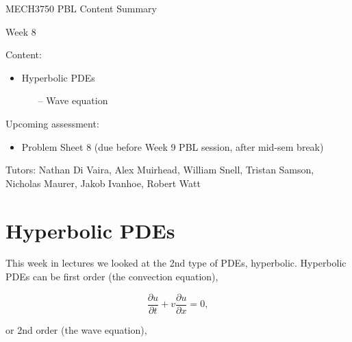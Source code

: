\documentclass[12pt]{article}
\begin{document}
\begin{center}
{\Huge   MECH3750 PBL Content Summary}

\vspace{6mm}

{\Huge  Week 8}

\end{center}

\vspace{6mm}

{\Large Content:}
{\begin{itemize}
	\item Hyperbolic PDEs
	\begin{itemize}
		\item[--] Wave equation
	\end{itemize}
\end{itemize}}

\vspace{4mm}

{\Large Upcoming assessment:}
{\begin{itemize}
	\item Problem Sheet 8 (due before Week 9 PBL session, after mid-sem break)
\end{itemize}}

\vspace{4mm}

{Tutors: Nathan Di Vaira, Alex Muirhead, William Snell, Tristan Samson, Nicholas Maurer, Jakob Ivanhoe, Robert Watt}


\pagebreak

\section{Hyperbolic PDEs}

This week in lectures we looked at the 2nd type of PDEs, hyperbolic. Hyperbolic PDEs can be first order (the convection equation),

\vspace{2mm}

$$ \frac{\partial u}{\partial t} + v \frac{\partial u}{\partial x} = 0, $$

\vspace{4mm}

or 2nd order (the wave equation),

\vspace{2mm}
\end{document}
